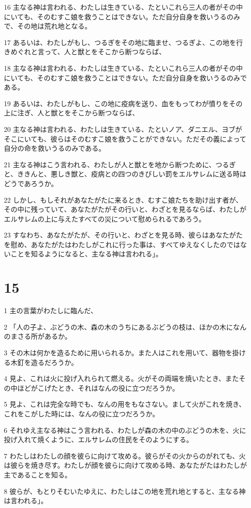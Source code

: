 \par 16 主なる神は言われる、わたしは生きている、たといこれら三人の者がその中にいても、そのむすこ娘を救うことはできない。ただ自分自身を救いうるのみで、その地は荒れ地となる。
\par 17 あるいは、わたしがもし、つるぎをその地に臨ませ、つるぎよ、この地を行きめぐれと言って、人と獣とをそこから断つならば、
\par 18 主なる神は言われる、わたしは生きている、たといこれら三人の者がその中にいても、そのむすこ娘を救うことはできない。ただ自分自身を救いうるのみである。
\par 19 あるいは、わたしがもし、この地に疫病を送り、血をもってわが憤りをその上に注ぎ、人と獣とをそこから断つならば、
\par 20 主なる神は言われる、わたしは生きている、たといノア、ダニエル、ヨブがそこにいても、彼らはそのむすこ娘を救うことができない。ただその義によって自分の命を救いうるのみである。
\par 21 主なる神はこう言われる、わたしが人と獣とを地から断つために、つるぎと、ききんと、悪しき獣と、疫病との四つのきびしい罰をエルサレムに送る時はどうであろうか。
\par 22 しかし、もしそれがあなたがたに来るとき、むすこ娘たちを助け出す者が、その中に残っていて、あなたがたがその行いと、わざとを見るならば、わたしがエルサレムの上に与えたすべての災について慰められるであろう。
\par 23 すなわち、あなたがたが、その行いと、わざとを見る時、彼らはあなたがたを慰め、あなたがたはわたしがこれに行った事は、すべてゆえなくしたのではないことを知るようになると、主なる神は言われる」。

\chapter{15}

\par 1 主の言葉がわたしに臨んだ、
\par 2 「人の子よ、ぶどうの木、森の木のうちにあるぶどうの枝は、ほかの木になんのまさる所があるか。
\par 3 その木は何かを造るために用いられるか。また人はこれを用いて、器物を掛ける木釘を造るだろうか。
\par 4 見よ、これは火に投げ入れられて燃える。火がその両端を焼いたとき、またその中ほどがこげたとき、それはなんの役に立つだろうか。
\par 5 見よ、これは完全な時でも、なんの用をもなさない。まして火がこれを焼き、これをこがした時には、なんの役に立つだろうか。
\par 6 それゆえ主なる神はこう言われる、わたしが森の木の中のぶどうの木を、火に投げ入れて焼くように、エルサレムの住民をそのようにする。
\par 7 わたしはわたしの顔を彼らに向けて攻める。彼らがその火からのがれても、火は彼らを焼き尽す。わたしが顔を彼らに向けて攻める時、あなたがたはわたしが主であることを知る。
\par 8 彼らが、もとりそむいたゆえに、わたしはこの地を荒れ地とすると、主なる神は言われる」。

